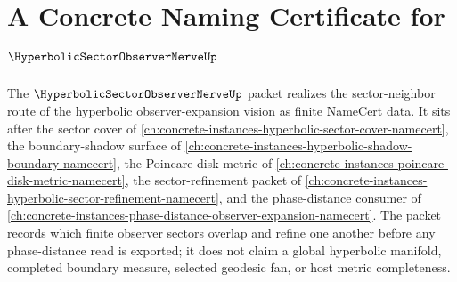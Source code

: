 \chapter{A Concrete Naming Certificate for $\HyperbolicSectorObserverNerveUp$}
\label{ch:concrete-instances-hyperbolic-sector-observer-nerve-namecert}

The $\HyperbolicSectorObserverNerveUp$ packet realizes the sector-neighbor route of the hyperbolic observer-expansion vision as finite NameCert data. It sits after the sector cover of \autoref{ch:concrete-instances-hyperbolic-sector-cover-namecert}, the boundary-shadow surface of \autoref{ch:concrete-instances-hyperbolic-shadow-boundary-namecert}, the Poincare disk metric of \autoref{ch:concrete-instances-poincare-disk-metric-namecert}, the sector-refinement packet of \autoref{ch:concrete-instances-hyperbolic-sector-refinement-namecert}, and the phase-distance consumer of \autoref{ch:concrete-instances-phase-distance-observer-expansion-namecert}. The packet records which finite observer sectors overlap and refine one another before any phase-distance read is exported; it does not claim a global hyperbolic manifold, completed boundary measure, selected geodesic fan, or host metric completeness.

